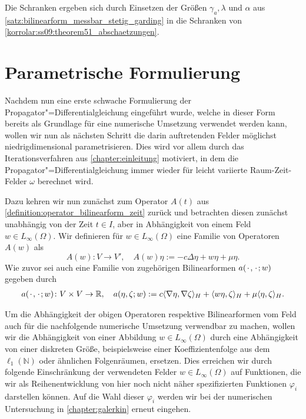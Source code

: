 \documentclass[../main.tex]{subfiles}
\begin{document}
\begin{Korollar}
    \begin{Beweis}
        Die Schranken ergeben sich durch Einsetzen der Größen $\gamma_{a}, \lambda$ und $\alpha$ aus \cref{satz:bilinearform_messbar_stetig_garding} in die Schranken von \cref{korrolar:ss09:theorem51_abschaetzungen}.
    \end{Beweis}
\end{Korollar}



\section{Parametrische Formulierung} %
\label{section:parametrische_formulierung}

Nachdem nun eine erste schwache Formulierung der Propagator"=Differentialgleichung eingeführt wurde, welche in dieser Form bereits als Grundlage für eine numerische Umsetzung verwendet werden kann, wollen wir nun als nächsten Schritt die darin auftretenden Felder möglichst niedrigdimensional parametrisieren.
Dies wird vor allem durch das Iterationsverfahren aus \cref{chapter:einleitung} motiviert, in dem die Propagator"=Differentialgleichung immer wieder für leicht variierte Raum-Zeit-Felder $\omega$ berechnet wird.

Dazu kehren wir nun zunächst zum Operator $A(t)$ aus \cref{definition:operator_bilinearform_zeit} zurück und betrachten diesen zunächst unabhängig von der Zeit $t \in I$, aber in Abhängigkeit von einem Feld $w \in L_{\infty}(\Omega)$.
Wir definieren für $w \in L_{\infty}(\Omega)$ eine Familie von Operatoren $A(w)$ als
\begin{equation}
    \label{eq:operator_feld}
    A(w) \colon V \to V', \quad A(w) \eta := - c \Delta \eta + w \eta + \mu \eta.
\end{equation}
Wie zuvor sei auch eine Familie von zugehörigen Bilinearformen $a({\mkern2mu\cdot\mkern2mu}, {\mkern2mu\cdot\mkern2mu}; w)$ gegeben durch
\begin{equation}
    \label{eq:bilinearform_feld}
    \begin{aligned}
        a({\mkern2mu\cdot\mkern2mu}, {\mkern2mu\cdot\mkern2mu}; w) \colon V \times V \to \mathbb{R}, \quad
        a(\eta, \zeta; w) := c\langle\nabla \eta,\nabla \zeta\rangle_{H} + \langle w \eta,\zeta\rangle_{H} + \mu \langle\eta,\zeta\rangle_{H}.
    \end{aligned}
\end{equation}

Um die Abhängigkeit der obigen Operatoren respektive Bilinearformen vom Feld auch für die nachfolgende numerische Umsetzung verwendbar zu machen, wollen wir die Abhängigkeit von einer Abbildung $w \in L_{\infty}(\Omega)$ durch eine Abhängigkeit von einer diskreten Größe, beispielsweise einer Koeffizientenfolge aus dem $\ell_{1}(\mathbb{N})$ oder ähnlichen Folgenräumen, ersetzen.
Dies erreichen wir durch folgende Einschränkung der verwendeten Felder $w \in L_{\infty}(\Omega)$ auf Funktionen, die wir als Reihenentwicklung von hier noch nicht näher spezifizierten Funktionen $\varphi_{i}$ darstellen können.
Auf die Wahl dieser $\varphi_{i}$ werden wir bei der numerischen Untersuchung in \cref{chapter:galerkin} erneut eingehen.
\end{document}
